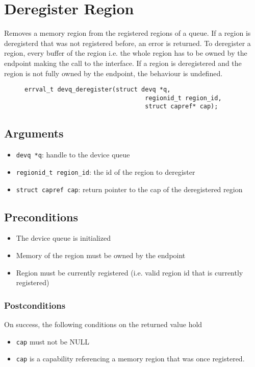 \documentclass[a4paper,11pt,twoside]{report}
\begin{document}
{{	\section{Deregister Region}
	Removes a memory region from the registered regions of a queue. 
	If a region is deregisterd that was not registered before, an error is returned. 
	To deregister a region, every buffer of the region i.e. the whole region has to be 
	owned by the endpoint making the call to the interface. If a region is deregistered and the 
	region is not fully owned by the endpoint, the behaviour is undefined.  
	\begin{figure}[h]
		\begin{lstlisting}[style=code]
		errval_t devq_deregister(struct devq *q,
		                         regionid_t region_id,
		                         struct capref* cap);
		\end{lstlisting}
		\label{lst:deregister}
	\end{figure}
	
	\subsection*{Arguments}
	\begin{itemize}
		\item \texttt{devq *q}: handle to the device queue
		\item \texttt{regionid\_t region\_id}: the id of the region to deregister
		\item \texttt{struct capref cap}: return pointer to the cap of the deregistered region
	\end{itemize}
	
	\subsection*{Preconditions}
	\begin{itemize}
		\item The device queue is initialized
		\item Memory of the region must be owned by the endpoint 
		\item Region must be currently registered (i.e. valid region id that is currently registered)
	\end{itemize}
	\subsubsection*{Postconditions}
	On success, the following conditions on the returned value hold
	\begin{itemize}
		\item \texttt{cap} must not be NULL
		\item \texttt{cap} is a capability referencing a memory region that was once registered.
	\end{itemize}
	
}}
\end{document}
